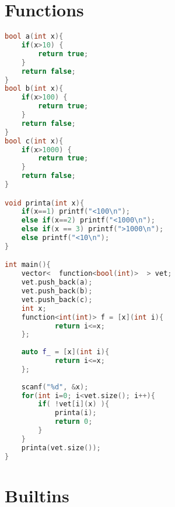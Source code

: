\documentclass[12pt,a4paper,twoside]{report}
\begin{document}
\section{Functions}
\noindent\begin{lstlisting}[caption=Functions,language=C++]
bool a(int x){
    if(x>10) {
        return true;
    }
    return false;
}
bool b(int x){
    if(x>100) {
        return true;
    }
    return false;
}
bool c(int x){
    if(x>1000) {
        return true;
    }
    return false;
}

void printa(int x){
    if(x==1) printf("<100\n");
    else if(x==2) printf("<1000\n");
    else if(x == 3) printf(">1000\n");
    else printf("<10\n");
}

int main(){
    vector<  function<bool(int)>  > vet;
    vet.push_back(a);
    vet.push_back(b);
    vet.push_back(c);
    int x;
    function<int(int)> f = [x](int i){
            return i<=x;
    };
    
    auto f_ = [x](int i){
            return i<=x;
    };
    
    scanf("%d", &x);
    for(int i=0; i<vet.size(); i++){
        if( !vet[i](x) ){
            printa(i);
            return 0;
        }
    }
    printa(vet.size());
}
\end{lstlisting}

\section{Builtins}
\end{document}
